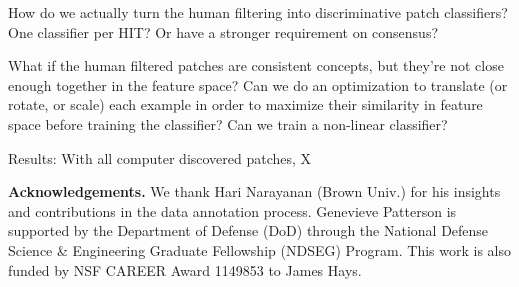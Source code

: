 \documentclass[10pt,twocolumn,letterpaper]{article}
\begin{document}
How do we actually turn the human filtering into discriminative patch classifiers? One classifier per HIT? Or have a stronger requirement on consensus?

What if the human filtered patches are consistent concepts, but they're not close enough together in the feature space? Can we do an optimization to translate (or rotate, or scale) each example in order to maximize their similarity in feature space before training the classifier? Can we train a non-linear classifier?

Results:
With all computer discovered patches, X%


\textbf{Acknowledgements.} We thank Hari Narayanan (Brown Univ.) for his insights and contributions in the data annotation process. Genevieve Patterson is supported by the Department of Defense (DoD) through the National Defense Science \& Engineering Graduate Fellowship (NDSEG) Program. This work is also funded by NSF CAREER Award 1149853 to James Hays. 

{\small%


}
\end{document}
